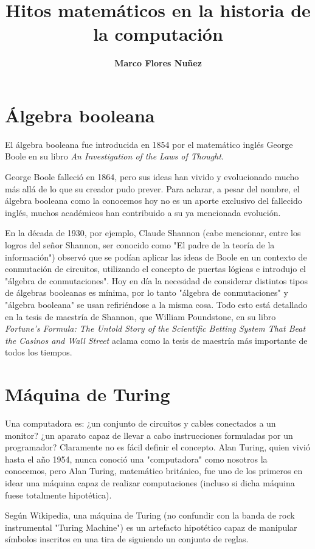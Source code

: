 \documentclass[a4paper,10pt]{article}
\title{Hitos matemáticos en la historia de la computación}
\author{\textbf{Marco Flores Nuñez}}
\begin{document}
\maketitle

\section{Álgebra booleana}

El álgebra booleana fue introducida en 1854 por el matemático inglés George Boole en su libro \textit{An Investigation of the Laws of Thought}. 

George Boole falleció en 1864, pero sus ideas han vivido y evolucionado mucho más allá de lo que su creador pudo prever. Para aclarar, a pesar del nombre, el álgebra booleana como la conocemos hoy no es un aporte exclusivo del fallecido inglés, muchos académicos han contribuido a su ya mencionada evolución.

En la década de 1930, por ejemplo, Claude Shannon (cabe mencionar, entre los logros del señor Shannon, ser conocido como "El padre de la teoría de la información") observó que se podían aplicar las ideas de Boole en un contexto de conmutación de circuitos, utilizando el concepto de puertas lógicas e introdujo el "álgebra de conmutaciones". Hoy en día la necesidad de considerar distintos tipos de álgebras booleanas es mínima, por lo tanto "álgebra de conmutaciones" y "álgebra booleana" se usan refiriéndose a la misma cosa. Todo esto está detallado en la tesis de maestría de Shannon, que William Poundstone, en su libro \textit{Fortune's Formula: The Untold Story of the Scientific Betting System That Beat the Casinos and Wall Street} aclama como la tesis de maestría más importante de todos los tiempos.

\section{Máquina de Turing}

Una computadora es: ¿un conjunto de circuitos y cables conectados a un monitor? ¿un aparato capaz de llevar a cabo instrucciones formuladas por un programador? Claramente no es fácil definir el concepto. Alan Turing, quien vivió hasta el año 1954, nunca conoció una "computadora" como nosotros la conocemos, pero Alan Turing, matemático británico, fue uno de los primeros en idear una máquina capaz de realizar computaciones (incluso si dicha máquina fuese totalmente hipotética).

Según Wikipedia, una máquina de Turing (no confundir con la banda de rock instrumental "Turing Machine") es un artefacto hipotético capaz de manipular símbolos inscritos en una tira de siguiendo un conjunto de reglas.
\end{document}
